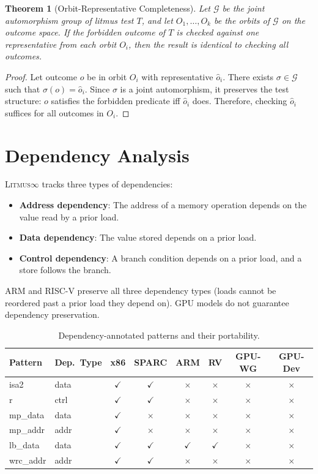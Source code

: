 \documentclass[10pt]{article}
\newcommand{\litmus}{\textsc{Litmus$\infty$}}
\newcommand{\cmark}{$\checkmark$}
\newcommand{\xmark}{$\times$}
\newtheorem{theorem}{Theorem}
\begin{document}
\begin{theorem}[Orbit-Representative Completeness]
\label{thm:orbit}
Let $\mathcal{G}$ be the joint automorphism group of litmus test $T$,
and let $O_1, \ldots, O_k$ be the orbits of $\mathcal{G}$ on the
outcome space. If the forbidden outcome of $T$ is checked against one
representative from each orbit $O_i$, then the result is identical
to checking all outcomes.
\end{theorem}

\begin{proof}
Let outcome $o$ be in orbit $O_i$ with representative $\hat{o}_i$.
There exists $\sigma \in \mathcal{G}$ such that $\sigma(o) = \hat{o}_i$.
Since $\sigma$ is a joint automorphism, it preserves the test structure:
$o$ satisfies the forbidden predicate iff $\hat{o}_i$ does. Therefore,
checking $\hat{o}_i$ suffices for all outcomes in $O_i$.
\end{proof}

\section{Dependency Analysis}
\label{app:dependencies}

\litmus{} tracks three types of dependencies:
\begin{itemize}[nosep]
\item \textbf{Address dependency}: The address of a memory operation
      depends on the value read by a prior load.
\item \textbf{Data dependency}: The value stored depends on a prior load.
\item \textbf{Control dependency}: A branch condition depends on a prior
      load, and a store follows the branch.
\end{itemize}

ARM and RISC-V preserve all three dependency types (loads cannot be
reordered past a prior load they depend on). GPU models do not
guarantee dependency preservation.

\begin{table}[h]
\centering
\caption{Dependency-annotated patterns and their portability.}
\label{tab:deps}
\small
\begin{tabular}{llcccccc}
\toprule
\textbf{Pattern} & \textbf{Dep.\ Type} & \textbf{x86} & \textbf{SPARC} & \textbf{ARM} & \textbf{RV} & \textbf{GPU-WG} & \textbf{GPU-Dev} \\
\midrule
isa2 & data & \cmark & \cmark & \xmark & \xmark & \xmark & \xmark \\
r & ctrl & \cmark & \cmark & \xmark & \xmark & \xmark & \xmark \\
mp\_data & data & \cmark & \xmark & \xmark & \xmark & \xmark & \xmark \\
mp\_addr & addr & \cmark & \xmark & \xmark & \xmark & \xmark & \xmark \\
lb\_data & data & \cmark & \cmark & \cmark & \cmark & \xmark & \xmark \\
wrc\_addr & addr & \cmark & \cmark & \xmark & \xmark & \xmark & \xmark \\
\bottomrule
\end{tabular}
\end{table}
\end{document}
